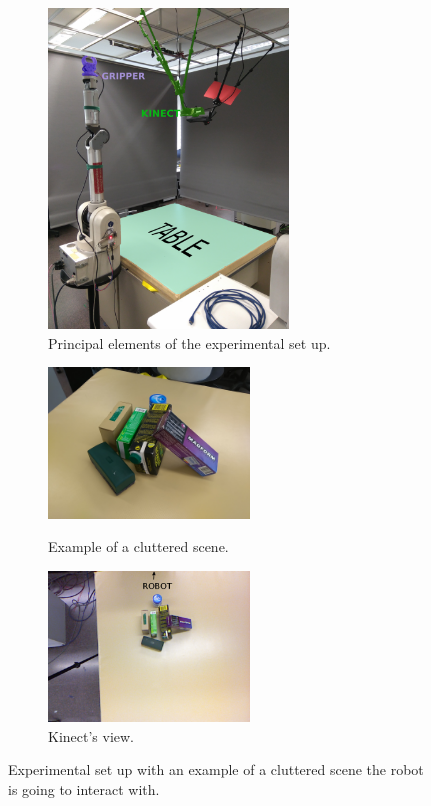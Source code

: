 \begin{figure}[tb]
\centering
\begin{subfigure}[b]{0.4\textwidth}
\includegraphics[height=8.5cm]{Img/set_up/set_up_nice2.png}
\caption{Principal elements of the experimental set up.}\label{fig:setup_}
\end{subfigure}
\qquad \qquad 
\begin{subfigure}[b]{0.4\textwidth}
\centering
\includegraphics[height=4cm]{Img/set_up/examplesetup.jpg}
\caption{Example of a cluttered scene.}\label{fig:example_scene}
\vspace{2ex}
\includegraphics[height=4cm]{Img/set_up/view_kinect2.png}
\caption{Kinect's view.}\label{fig:kinect_view}
\end{subfigure}
\caption{Experimental set up with an example of a cluttered scene the robot is going to interact with.}
\label{fig:setup}
\end{figure}





